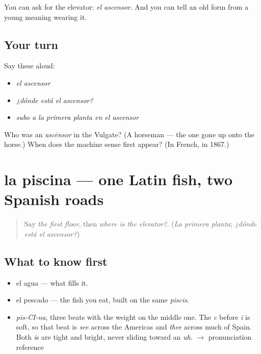 \begin{grammarlens}[title={What you've built}]
You can ask for the elevator: \emph{el ascensor}. And you can tell an old form from a young meaning wearing it.
\end{grammarlens}

\subsection*{Your turn}
Say these aloud:

\begin{itemize}
\raggedright
  \item \emph{el ascensor}
  \item \emph{¿dónde está el ascensor?}
  \item \emph{subo a la primera planta en el ascensor}
\end{itemize}

\begin{tcolorbox}[breakable,colback=teal!4,colframe=teal!35!black,title={Before you move on}]
Who was an \emph{ascēnsor} in the Vulgate? (A horseman — the one gone up onto the horse.) When does the machine sense first appear? (In French, in 1867.)
\end{tcolorbox}
\section[la piscina]{la piscina — one Latin fish, two Spanish roads}

\label{lesson:ES-C390-piscina}



\begin{quote}
Say \emph{the first floor}, then \emph{where is the elevator?}. (\emph{La primera planta}; \emph{¿dónde está el ascensor?})
\end{quote}

\subsection*{What to know first}
\begin{itemize}
\raggedright
  \item el agua — what fills it.
  \item el pescado — the fish you eat, built on the same \emph{piscis}.
\end{itemize}

\begin{sounds}
\begin{itemize}
\raggedright
  \item \emph{pis-CI-na}, three beats with the weight on the middle one. The \emph{c} before \emph{i} is soft, so that beat is \emph{see} across the Americas and \emph{thee} across much of Spain. Both \emph{i}s are tight and bright, never sliding toward an \emph{uh}. $\to$ pronunciation reference
\end{itemize}
\end{sounds}

